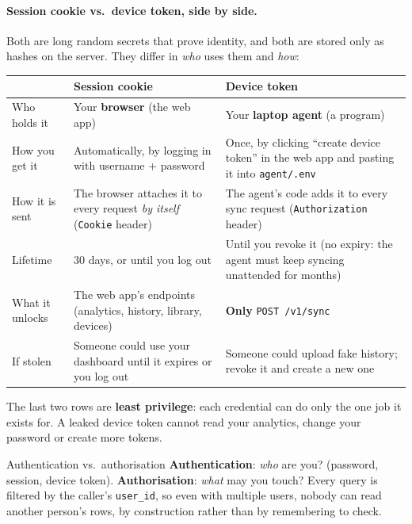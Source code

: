 \documentclass[11pt,a4paper]{article}
\begin{document}
\paragraph{Session cookie vs.\ device token, side by side.} Both are long random secrets that
prove identity, and both are stored only as hashes on the server. They differ in \emph{who} uses
them and \emph{how}:
\begin{center}
\renewcommand{\arraystretch}{1.2}
\begin{tabularx}{\textwidth}{l X X}
\toprule
 & \textbf{Session cookie} & \textbf{Device token} \\
\midrule
Who holds it & Your \textbf{browser} (the web app) & Your \textbf{laptop agent} (a program) \\
How you get it & Automatically, by logging in with username + password & Once, by clicking ``create device token'' in the web app and pasting it into \texttt{agent/.env} \\
How it is sent & The browser attaches it to every request \emph{by itself} (\texttt{Cookie} header) & The agent's code adds it to every sync request (\texttt{Authorization} header) \\
Lifetime & 30 days, or until you log out & Until you revoke it (no expiry: the agent must keep syncing unattended for months) \\
What it unlocks & The web app's endpoints (analytics, history, library, devices) & \textbf{Only} \texttt{POST /v1/sync} \\
If stolen & Someone could use your dashboard until it expires or you log out & Someone could upload fake history; revoke it and create a new one \\
\bottomrule
\end{tabularx}
\end{center}
\noindent The last two rows are \textbf{least privilege}: each credential can do only the one job
it exists for. A leaked device token cannot read your analytics, change your password or create
more tokens.

\begin{concept}{Authentication vs.\ authorisation}
\textbf{Authentication}: \emph{who} are you? (password, session, device token).
\textbf{Authorisation}: \emph{what} may you touch? Every query is filtered by the caller's
\texttt{user\_id}, so even with multiple users, nobody can read another person's rows, by
construction rather than by remembering to check.
\end{concept}
\end{document}
